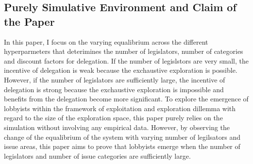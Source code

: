 \documentclass{article}
\begin{document}

\subsection{Purely Simulative Environment and Claim of the Paper}
In this paper, I focus on the varying equalibrium across the different hyperparmeters that deterimines the number of legislators, number of categories and discount factors for delegation.
If the number of legislstors are very small, the incentive of delegation is weak because the exchaustive exploration is possible.
However, if the number of legislators are sufficiently large, the incentive of delegation is strong because the exchaustive exploration is impossible
and benefits from the delegation become more significant. To explore the emergence of lobbyists within the framework of exploitation and exploration dillemma with regard to the size of the exploration space, this paper purely relies on the simulation without involving any empirical data. 
However, by observing the change of the equalibrium of the system with varying number of legilsators and issue areas, this paper aims to prove that lobbyists emerge when the number of legislators and number of issue categories are sufficiently large.
\end{document}
